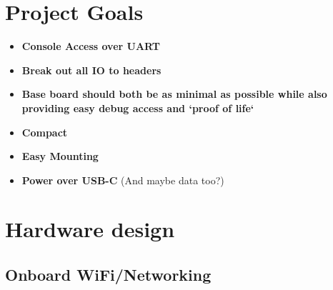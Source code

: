 \documentclass[a4paper,12pt]{report}
\begin{document}
	\chapter{Project Goals}
	\begin{itemize}
		\item{
			\bfseries{Console Access over UART}
		}
		
		\item{
			\textbf{Break out all IO to headers}
		}
	
		\item{
			\textbf{Base board should both be as minimal as possible while also providing easy debug access and `proof of life`}
		}
		
		\item{
			\textbf{Compact}
		}
	
		\item{
			\textbf{Easy Mounting}
		}
		
		\item{
			\textbf{Power over USB-C} (And maybe data too?)
		}
	\end{itemize}

	\chapter{Hardware design}
	\section{Onboard WiFi/Networking}
	
\end{document}
